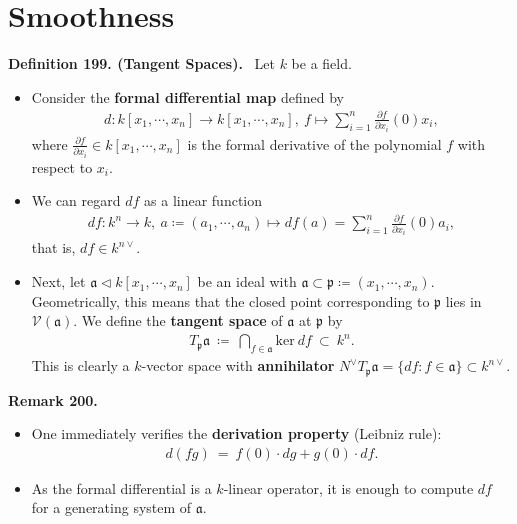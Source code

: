 \documentclass[12pt,a4paper,footinclude=true,headinclude=true]{scrbook} %
\newenvironment{definition}[2][Definition]
    { \begin{mdframed}[backgroundcolor=gray!20] \textbf{#1 #2.}\ }
    {  \end{mdframed}}
\newenvironment{remark}[2][Remark]
    { \begin{mdframed}[backgroundcolor=gray!20] \textbf{#1 #2.} }
    {  \end{mdframed}}
\begin{document}
\section{Smoothness}
\begin{definition}{199. (Tangent Spaces)}
    Let $k$ be a field. 
    \begin{itemize}
        \item Consider the \textbf{formal differential map} defined by
        \begin{align*}
            d:k[x_1,\cdots,x_n]\longrightarrow k[x_1,\cdots,x_n],\ f\longmapsto\sum_{i=1}^n\tfrac{\partial f}{\partial x_i}(0)x_i,
        \end{align*}
        where $\frac{\partial f}{\partial x_i}\in k[x_1,\cdots,x_n]$ is the formal derivative of the polynomial $f$ with respect to $x_i$. 
        \item We can regard $df$ as a linear function
        \begin{align*}
            df:k^n\longrightarrow k,\ a\coloneqq(a_1,\cdots,a_n)\mapsto df(a)=\sum_{i=1}^n\tfrac{\partial f}{\partial x_i}(0)a_i,
        \end{align*}
        that is, $df\in k^{n\vee}$.
        \item Next, let $\mathfrak{a}\triangleleft k[x_1,\cdots,x_n]$ be an ideal with $\mathfrak{a}\subset\mathfrak{p}\coloneqq(x_1,\cdots,x_n)$. Geometrically, this means that the closed point corresponding to $\mathfrak{p}$ lies in $\mathcal{V}(\mathfrak{a})$. We define the \textbf{tangent space} of $\mathfrak{a}$ at $\mathfrak{p}$ by 
        \begin{align*}
            T_\mathfrak{p}\mathfrak{a}\ \coloneqq\ \bigcap_{f\in\mathfrak{a}}\mathrm{ker}\ df\ \subset\ k^n.
        \end{align*}
        This is clearly a $k$-vector space with \textbf{annihilator} $N^\vee T_\mathfrak{p}\mathfrak{a}=\{df:f\in\mathfrak{a}\}\subset k^{n\vee}$.
    \end{itemize}
\end{definition}

\begin{remark}{200}
    \begin{itemize}
        \item[(a)] One immediately verifies the \textbf{derivation property} (Leibniz rule):
        \begin{align*}
            d(fg)\ =\ f(0)\cdot dg+g(0)\cdot df.
        \end{align*}
        \item[(b)] As the formal differential is a $k$-linear operator, it is enough to compute $df$ for a generating system of $\mathfrak{a}$.
    \end{itemize}
\end{remark}
\end{document}
